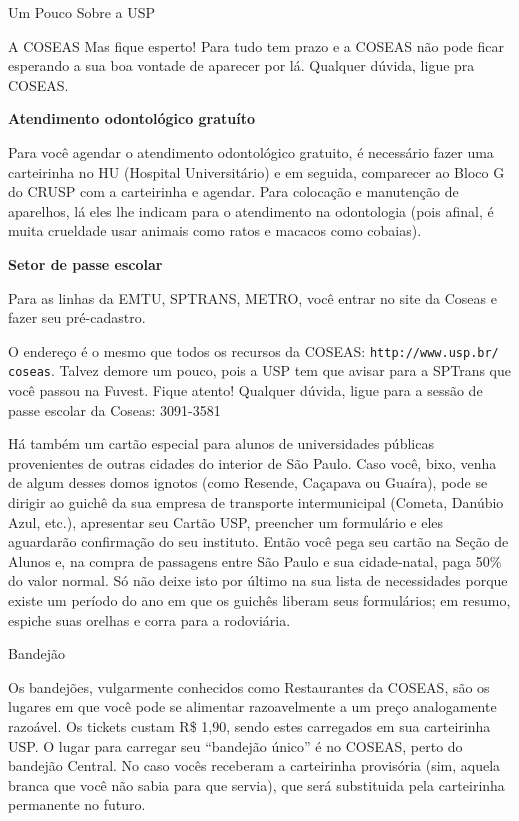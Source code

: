 \begin{secao}{Um Pouco Sobre a USP}
\begin{subsecao}{A COSEAS}
Mas fique esperto! Para tudo tem prazo e a COSEAS não pode ficar esperando a sua
boa vontade de aparecer por lá. Qualquer dúvida, ligue pra COSEAS.

{\bf Atendimento odontológico gratuíto}

Para você agendar o atendimento odontológico gratuito, é necessário fazer uma
carteirinha no HU (Hospital Universitário) e em seguida, comparecer ao Bloco G
do CRUSP com a carteirinha e agendar. Para colocação e manutenção de aparelhos,
lá eles lhe indicam para o atendimento na odontologia (pois afinal, é muita
crueldade usar animais como ratos e macacos como cobaias). 

{\bf Setor de passe escolar}

Para as linhas da EMTU, SPTRANS, METRO, você entrar no site da Coseas e fazer
seu pré-cadastro. 

O endereço é o mesmo que todos os recursos da COSEAS: {\tt http://www.usp.br/
coseas}. Talvez demore um pouco, pois a USP tem 
que avisar para a SPTrans que você passou na Fuvest. Fique atento! Qualquer 
dúvida, ligue para a sessão de passe escolar da Coseas: 3091-3581 

Há também um cartão especial para alunos de universidades públicas provenientes
de outras cidades do interior de São Paulo. Caso você, bixo, venha de algum desses domos ignotos
(como Resende, Caçapava ou Guaíra), pode se dirigir ao guichê da sua empresa de
transporte intermunicipal (Cometa, Danúbio Azul, etc.), apresentar seu Cartão USP,
preencher um formulário e eles aguardarão confirmação do seu instituto. Então
você pega seu cartão na Seção de Alunos e, na compra de passagens entre São Paulo
e sua cidade-natal, paga 50\% do valor normal. Só não deixe isto por último na
sua lista de necessidades porque existe um período do ano em que os guichês
liberam seus formulários; em resumo, espiche suas orelhas e corra para a rodoviária.

\end{subsecao}

\pagebreak
{}

\begin{subsecao}{Bandejão}


Os bandejões, vulgarmente conhecidos como Restaurantes da COSEAS, são os lugares
em que você pode se alimentar razoavelmente a um preço analogamente razoável.
Os tickets custam R\$ 1,90, sendo estes carregados em sua carteirinha USP. O 
lugar para carregar seu ``bandejão único'' é no COSEAS, perto do bandejão 
Central. No caso vocês receberam a carteirinha provisória (sim, aquela 
branca que você não sabia para que servia), que será substituida pela carteirinha
permanente no futuro.


\end{subsecao}
\end{secao}
